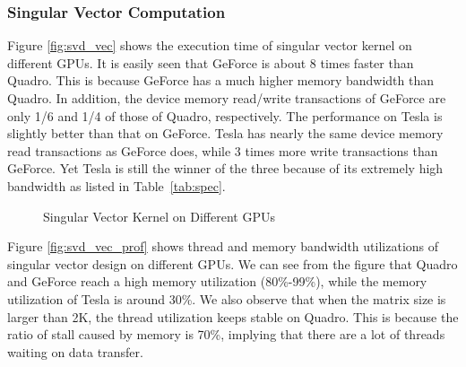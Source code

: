 \subsubsection{Singular Vector Computation}
Figure \ref{fig:svd_vec} shows the execution time of singular vector kernel on different GPUs. 
It is easily seen that GeForce is about 8 times faster than
Quadro. This is because GeForce has a much higher memory bandwidth
than Quadro.
In addition, the device memory read/write transactions of GeForce are only 1/6 and 1/4 of those of Quadro, respectively.
The performance on Tesla is slightly better than that on GeForce.
Tesla has nearly the same device memory read transactions as GeForce does, while 3 times more write transactions than GeForce.
Yet Tesla is still the winner of the three because of its extremely high
bandwidth as listed in Table~\ref{tab:spec}.

\begin{figure}[hbpt]
\vspace{-0.3in}
\centering
\vspace{-0.1in}
  \caption{Singular Vector Kernel on Different GPUs}
  \label{fig:svdvec}
\vspace{-0.3in}
\end{figure}

Figure \ref{fig:svd_vec_prof} shows thread and memory bandwidth utilizations of singular vector design on different GPUs. 
We can see from the figure that Quadro and GeForce reach a high memory utilization (80\%-99\%), while the memory utilization of Tesla is around 30\%. 
We also observe that when the matrix size is larger than 2K, the thread utilization keeps stable on Quadro. 
This is because the ratio of stall caused by memory is 70\%, implying that there are a lot of threads waiting on data transfer.
\fi 

